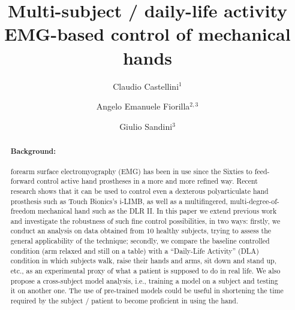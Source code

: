 \documentclass[10pt]{bmc_article}
\newenvironment{bmcformat}
  {\begin{raggedright}\baselineskip20pt\sloppy\setboolean{publ}{false}}
  {\end{raggedright}\baselineskip20pt\sloppy}
\begin{document}
\begin{bmcformat}

\title{Multi-subject / daily-life activity\\EMG-based control of mechanical hands}
 
\author{%
  Claudio Castellini\correspondingauthor$^1$%
\and
  Angelo Emanuele Fiorilla$^{2,3}$%
\and
  Giulio Sandini$^3$%
}%

\address{%
    \iid(1)LIRA-Lab, University of Genova, viale F. Causa 13, 16145 Genova, Italy\\
    \iid(2)DIST, University of Genova, viale F. Causa 13, 16145 Genova, Italy\\
    \iid(3)Italian Institute of Technology, via Morego 30, 16163 Genova, Italy
}%

\maketitle

\begin{abstract}

\paragraph*{Background:}

forearm surface electromyography (EMG) has been in use since the Sixties
to feed-forward control active hand prostheses in a more and more refined way.
Recent research shows that it can be used to control even a dexterous
polyarticulate hand prosthesis such as Touch Bionics's i-LIMB,
as well as a multifingered, multi-degree-of-freedom mechanical hand such
as the DLR II. In this paper we extend previous work and investigate
the robustness of such fine control possibilities, in two ways: firstly,
we conduct an analysis on data obtained from $10$ healthy subjects, trying
to assess the general applicability of the technique; secondly, we compare
the baseline controlled condition (arm relaxed and still on a table) with
a ``Daily-Life Activity'' (DLA) condition in which subjects walk, raise
their hands and arms, sit down and stand up, etc., as an experimental proxy
of what a patient is supposed to do in real life.
We also propose a cross-subject model analysis,
i.e., training a model on a subject and testing it on another one. The use
of pre-trained models could be useful in shortening the time required by
the subject / patient to become proficient in using the hand.


\end{abstract}
\end{bmcformat}
\end{document}
